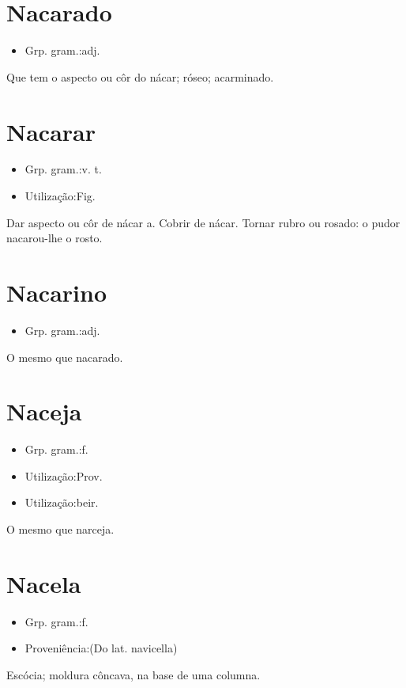 \section{Nacarado}
\begin{itemize}
\item {Grp. gram.:adj.}
\end{itemize}
Que tem o aspecto ou côr do nácar; róseo; acarminado.
\section{Nacarar}
\begin{itemize}
\item {Grp. gram.:v. t.}
\end{itemize}
\begin{itemize}
\item {Utilização:Fig.}
\end{itemize}
Dar aspecto ou côr de nácar a.
Cobrir de nácar.
Tornar rubro ou rosado: \textunderscore o pudor nacarou-lhe o rosto\textunderscore .
\section{Nacarino}
\begin{itemize}
\item {Grp. gram.:adj.}
\end{itemize}
O mesmo que \textunderscore nacarado\textunderscore .
\section{Naceja}
\begin{itemize}
\item {Grp. gram.:f.}
\end{itemize}
\begin{itemize}
\item {Utilização:Prov.}
\end{itemize}
\begin{itemize}
\item {Utilização:beir.}
\end{itemize}
O mesmo que \textunderscore narceja\textunderscore .
\section{Nacela}
\begin{itemize}
\item {Grp. gram.:f.}
\end{itemize}
\begin{itemize}
\item {Proveniência:(Do lat. \textunderscore navicella\textunderscore )}
\end{itemize}
Escócia; moldura côncava, na base de uma columna.
